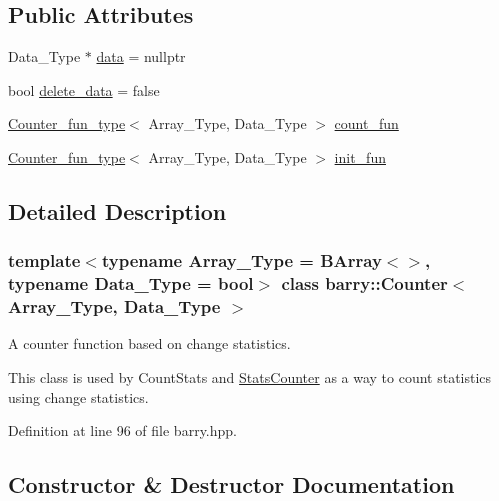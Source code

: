 \subsection*{Public Attributes}
\begin{DoxyCompactItemize}
\item 
Data\+\_\+\+Type $\ast$ \hyperlink{classbarry_1_1_counter_af8196eeaaa4b58b788969c07aee7f1ee}{data} = nullptr
\item 
bool \hyperlink{classbarry_1_1_counter_a5445fa47abeff4b5675a5e5c12e4917a}{delete\+\_\+data} = false
\item 
\hyperlink{namespacebarry_abaaae3200da8e4b7faac3c04fe9c3081}{Counter\+\_\+fun\+\_\+type}$<$ Array\+\_\+\+Type, Data\+\_\+\+Type $>$ \hyperlink{classbarry_1_1_counter_aa535e164838a3a9c780e8d15fe45679b}{count\+\_\+fun}
\item 
\hyperlink{namespacebarry_abaaae3200da8e4b7faac3c04fe9c3081}{Counter\+\_\+fun\+\_\+type}$<$ Array\+\_\+\+Type, Data\+\_\+\+Type $>$ \hyperlink{classbarry_1_1_counter_a2509d75d3fc9e33d708911a38373d8ab}{init\+\_\+fun}
\end{DoxyCompactItemize}


\subsection{Detailed Description}
\subsubsection*{template$<$typename Array\+\_\+\+Type = B\+Array$<$$>$, typename Data\+\_\+\+Type = bool$>$\newline
class barry\+::\+Counter$<$ Array\+\_\+\+Type, Data\+\_\+\+Type $>$}

A counter function based on change statistics. 

This class is used by {\ttfamily Count\+Stats} and {\ttfamily \hyperlink{classbarry_1_1_stats_counter}{Stats\+Counter}} as a way to count statistics using change statistics. 

Definition at line 96 of file barry.\+hpp.



\subsection{Constructor \& Destructor Documentation}
\mbox{\label{classbarry_1_1_counter_a3c990d6dbcdc553b3179c8353497a7df}} 
